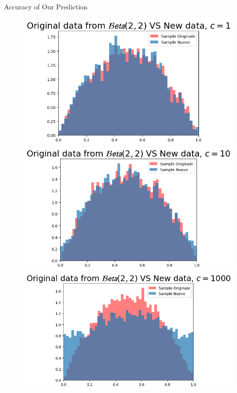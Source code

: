 \documentclass{beamer}
\begin{document}
\begin{frame}{Accuracy of Our Prediction}
\begin{figure}
\begin{minipage}{0.32\textwidth}
        \end{minipage}
    \end{figure}
    \caption{Predictive density estimated for an \(Unif(1/4,3/4)\)}

\bigskip
    \begin{figure}
        \begin{minipage}{0.32\textwidth}
            \centering
            \includegraphics[width=\textwidth]{PredBetac1.png}
        \end{minipage}
        \hfill
        \begin{minipage}{0.32\textwidth}
            \centering
            \includegraphics[width=\textwidth]{PredBetac10.png}
        \end{minipage}
        \hfill
        \begin{minipage}{0.32\textwidth}
            \centering
            \includegraphics[width=\textwidth]{PredBetac1000.png}

\end{minipage}
\end{figure}
\end{frame}
\end{document}
